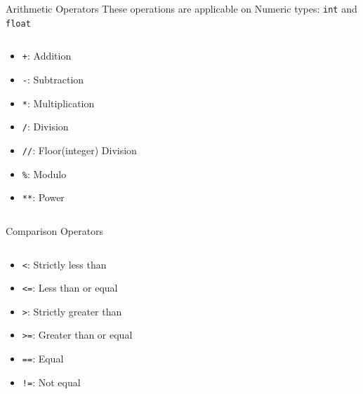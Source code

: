         \begin{frame}{Arithmetic Operators}
            \LARGE
            These operations are applicable on Numeric types: \texttt{int} and \texttt{float}
            \begin{columns}
               \begin{column}{0.35\textwidth}
                \vspace{-5mm}
                \begin{itemize}
                    \item \texttt{+}: Addition
                    \item \texttt{-}: Subtraction
                    \item \texttt{*}: Multiplication
                    \item \texttt{/}: Division
                    \item \texttt{//}: Floor(integer) Division
                    \item \texttt{\%}: Modulo
                    \item \texttt{**}: Power 
                \end{itemize}
               \end{column}
               \begin{column}{0.65\textwidth}
                \inputminted[frame=single,framesep=2pt]{python3}{../Lecture2/code-examples/numeric_operators.py}
               \end{column} 
            \end{columns}
        \end{frame}

        \begin{frame}{Comparison Operators}
            \LARGE
            \begin{columns}
                \begin{column}{0.4\textwidth}
                    \begin{itemize}
                        \item \texttt{<}: Strictly less than
                        \item \texttt{<=}: Less than or equal
                        \item \texttt{>}: Strictly greater than
                        \item \texttt{>=}: Greater than or equal
                        \item \texttt{==}: Equal
                        \item \texttt{!=}: Not equal
                    \end{itemize}
                \end{column}
                \begin{column}{0.6\textwidth}
                    \inputminted[frame=single,framesep=2pt]{python3}{../Lecture2/code-examples/comparison.py}
                \end{column}
            \end{columns}
        \end{frame}

